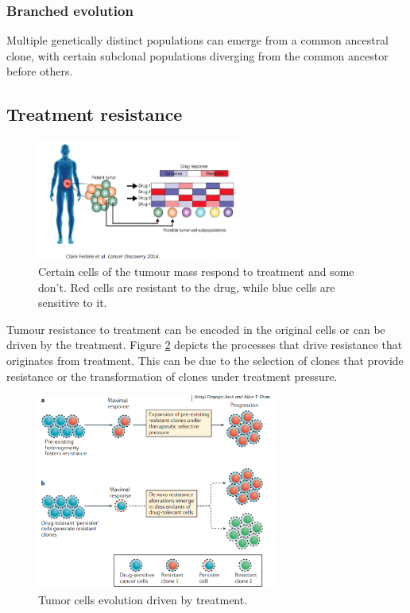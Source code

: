 		\subsubsection{Branched evolution}
		Multiple genetically distinct populations can emerge from a common ancestral clone, with certain subclonal populations diverging from the common ancestor before others.


	\subsection{Treatment resistance}

	\begin{figure}[H]
		\centering
		\includegraphics[width=0.6\textwidth]{treatment.png}
		\caption{Certain cells of the tumour mass respond to treatment and some don't. Red cells are resistant to the drug, while blue cells are sensitive to it.}
		\label{fig:treatment_resistance}
	\end{figure}

	Tumour resistance to treatment can be encoded in the original cells or can be driven by the treatment.
	Figure \ref{fig:response} depicts the processes that drive resistance that originates from treatment.
	This can be due to the selection of clones that provide resistance or the transformation of clones under treatment pressure.

	\begin{figure}[H]
		\centering
		\includegraphics[width=0.7\textwidth]{response.png}
		\caption{ Tumor cells evolution driven by treatment.}
		\label{fig:response}
	\end{figure}

